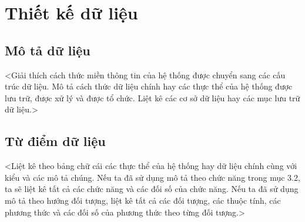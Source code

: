 
\clearpage

\section{Thiết kế dữ liệu}

\subsection{Mô tả dữ liệu}
<Giải thích cách thức miền thông tin của hệ thống được chuyển sang các cấu trúc dữ liệu. Mô tả 
cách thức dữ liệu chính hay các thực thể của hệ thống được lưu trữ, được xử lý và được tổ chức. 
Liệt kê các cơ sở dữ liệu hay các mục lưu trữ dữ liệu.> 

\subsection{Từ điểm dữ liệu}
<Liệt kê theo bảng chữ cái các thực thể của hệ thống hay dữ liệu chính cùng với kiểu và các mô tả 
chúng. Nếu ta đã sử dụng mô tả theo chức năng trong mục 3.2, ta sẽ liệt kê tất cả các chức năng 
và các đối số của chức năng. Nếu ta đã sử dụng mô tả theo hướng đối tượng, liệt kê tất cả các đối 
tượng, các thuộc tính, các phương thức và các đối số của phương thức theo từng đối tượng.> 


